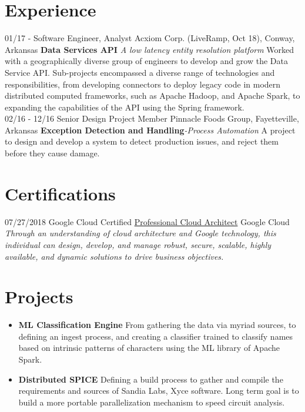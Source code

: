 \documentclass[]{friggeri-cv}
\begin{document}
\section{Experience}
\begin{entrylist}
  \entry
    {01/17 - }
    {Software Engineer, Analyst}
    {Acxiom Corp. (LiveRamp, Oct 18), Conway, Arkansas}
    {\textbf{Data Services API} \textit{A low latency entity resolution platform} Worked with a geographically diverse group of engineers to develop and grow the Data Service API. Sub-projects encompassed a diverse range of technologies and responsibilities, from developing connectors to deploy legacy code in modern distributed computed frameworks, such as Apache Hadoop, and Apache Spark, to expanding the capabilities of the API using the Spring framework. \\}
  \entry
    {02/16 - 12/16}
    {Senior Design Project Member}
    {Pinnacle Foods Group, Fayetteville, Arkansas}
    {\textbf{Exception Detection and Handling}\textit{-Process Automation} A project to design and develop a system to detect production issues, and reject them before they cause damage.\\}
\end{entrylist}

\section{Certifications}
\begin{entrylist}
 \entry
   {07/27/2018}
   {Google Cloud Certified \href{https://www.credential.net/nwr1hwwq?key=22e8d9d6b741e6ba83b36d6912d092d5bcda893c26b970eed35f9a70da86a45e}{Professional Cloud Architect}}
   {Google Cloud}
   {\textit{Through an understanding of cloud architecture and Google technology, this individual can design, develop, and manage robust, secure, scalable, highly available, and dynamic solutions to drive business objectives.}}
\end{entrylist}

\section{Projects}
\begin{itemize}
  \item
    {\textbf{ML Classification Engine} From gathering the data via myriad sources, to defining an ingest process, and creating a classifier trained to classify names based on intrinsic patterns of characters using the ML library of Apache Spark.}
  \item
    {\textbf{Distributed SPICE} Defining a build process to gather and compile the requirements and sources of Sandia Labs, Xyce software. Long term goal is to build a more portable parallelization mechanism to speed circuit analysis.}
\end{itemize}
\end{document}
